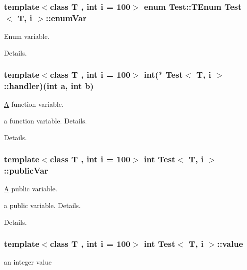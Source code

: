 \subsubsection[{enum\+Var}]{\setlength{\rightskip}{0pt plus 5cm}template$<$class T , int i = 100$>$ enum {\bf Test\+::\+T\+Enum}
          {\bf Test}$<$ T, {\bf i} $>$\+::enum\+Var}\label{class_test_ad27c261f542747a0a9e8f03b19d0e8cc}


Enum variable. 

Details. \hypertarget{class_test_a2ce50e60d16f5071772c6acde08181bd}{}
\subsubsection[{handler}]{\setlength{\rightskip}{0pt plus 5cm}template$<$class T , int i = 100$>$ int($\ast$ {\bf Test}$<$ T, {\bf i} $>$\+::handler)(int {\bf a}, int {\bf b})}\label{class_test_a2ce50e60d16f5071772c6acde08181bd}


\hyperlink{class_a}{A} function variable. 

a function variable. Details.

Details. \hypertarget{class_test_aba22fd8dcb6ca747e2266fadaf5bc383}{}
\subsubsection[{public\+Var}]{\setlength{\rightskip}{0pt plus 5cm}template$<$class T , int i = 100$>$ int {\bf Test}$<$ T, {\bf i} $>$\+::public\+Var}\label{class_test_aba22fd8dcb6ca747e2266fadaf5bc383}


\hyperlink{class_a}{A} public variable. 

a public variable. Details.

Details. \hypertarget{class_test_aefcbb7ead19f2c28a71a3a3f26cef6cb}{}
\subsubsection[{value}]{\setlength{\rightskip}{0pt plus 5cm}template$<$class T , int i = 100$>$ int {\bf Test}$<$ T, {\bf i} $>$\+::value\hspace{0.3cm}{\ttfamily [protected]}}\label{class_test_aefcbb7ead19f2c28a71a3a3f26cef6cb}
an integer value \hypertarget{class_test_ae75d55c8cf6390227d51c0965a4de296}{}
